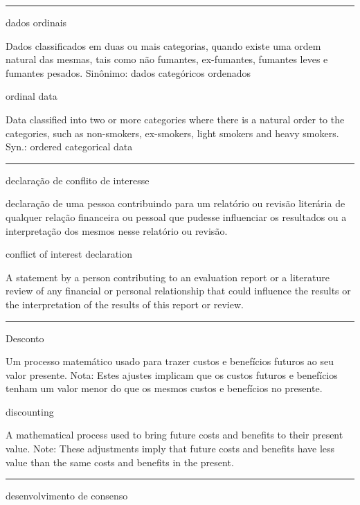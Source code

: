 \documentclass[
  openany]{book}
\begin{document}
\begin{center}\rule{0.5\linewidth}{0.5pt}\end{center}

dados ordinais

Dados classificados em duas ou mais categorias, quando existe uma ordem natural das mesmas, tais como não fumantes, ex-fumantes, fumantes leves e fumantes pesados. Sinônimo: dados categóricos ordenados

ordinal data

Data classified into two or more categories where there is a natural order to the categories, such as non-smokers, ex-smokers, light smokers and heavy smokers. Syn.: ordered categorical data

\begin{center}\rule{0.5\linewidth}{0.5pt}\end{center}

declaração de conflito de interesse

declaração de uma pessoa contribuindo para um relatório ou revisão literária de qualquer relação financeira ou pessoal que pudesse influenciar os resultados ou a interpretação dos mesmos nesse relatório ou revisão.

conflict of interest declaration

A statement by a person contributing to an evaluation report or a literature review of any financial or personal relationship that could influence the results or the interpretation of the results of this report or review.

\begin{center}\rule{0.5\linewidth}{0.5pt}\end{center}

Desconto

Um processo matemático usado para trazer custos e benefícios futuros ao seu valor presente. Nota: Estes ajustes implicam que os custos futuros e benefícios tenham um valor menor do que os mesmos custos e benefícios no presente.

discounting

A mathematical process used to bring future costs and benefits to their present value. Note: These adjustments imply that future costs and benefits have less value than the same costs and benefits in the present.

\begin{center}\rule{0.5\linewidth}{0.5pt}\end{center}

desenvolvimento de consenso
\end{document}
